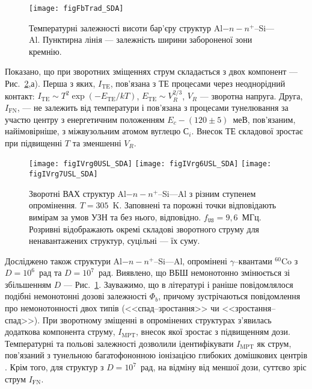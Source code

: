 \documentclass[a5paper,10pt,twoside,openany,article]{memoir} %
\begin{document}
\begin{figure}
\center
\texttt{[image: figFbTrad\_SDA]}
\caption{\label{figFbTrad_SDA}
Температурні залежності висоти бар'єру структур Al$-n-n^+$--Si---Al.
Пунктирна лінія --- залежність ширини забороненої зони кремнію.
}%
\end{figure}

Показано, що при зворотних зміщеннях струм складається з двох компонент --- Рис.~\ref{figIVrg0USL_SDA},а).
Перша з яких, $I_\mathrm{TE}$, пов'язана з ТЕ процесами через неоднорідний контакт: 
$I_\mathrm{TE}\sim T^2\exp(-E_\mathrm{TE}/kT)$,
$E_\mathrm{TE}\sim V_R^{2/3}$, 
$V_R$ --- зворотна напруга.
Друга, $I_\mathrm{FN}$, --- не залежить від температури і пов'язана з процесами тунелювання за участю
центру з енергетичним положенням $E_c-(120\pm5)$~меВ, пов'язаним, найімовірніше, з міжвузольним атомом вуглецю С$_i$.
Внесок ТЕ складової зростає при підвищенні $T$ та зменшенні $V_R$.

\begin{figure}
\center
\texttt{[image: figIVrg0USL\_SDA]}\hfill
\texttt{[image: figIVrg6USL\_SDA]}\hfill
\texttt{[image: figIVrg7USL\_SDA]}
\caption{\label{figIVrg0USL_SDA}
Зворотні  ВАХ  структур Al$-n-n^+$--Si---Al з різним ступенем опромінення.
$T=305$~K.
Заповнені та порожні точки відповідають вимірам за умов УЗН та без нього, відповідно.
$f_\mathtt{US}=9,6$~МГц.
Розривні відображають окремі складові зворотного струму для ненавантажених структур,
суцільні --- їх суму.
}%
\end{figure}

Досліджено також структури Al$-n-n^+$--Si---Al, опромінені $\gamma$--квантами $^{60}$Co з $D=10^6$~рад та $D=10^7$~рад.
Виявлено, що ВБШ немонотонно змінюється зі збільшенням $D$ --- Рис.~\ref{figFbTrad_SDA}.
Зауважимо, що в літературі і раніше повідомлялося подібні немонотонні дозові залежності $\Phi_{b}$, причому зустрічаються повідомлення про немонотонності двох типів (<<спад--зростання>> чи <<зростання--спад>>).
При зворотному зміщенні в опромінених структурах з'явилась додаткова компонента струму, $I_\mathrm{MPT}$, внесок якої зростає з підвищенням дози.
Температурні та польові залежності дозволили ідентифікувати $I_\mathrm{MPT}$ як струм, пов'язаний з тунельною багатофононною іонізацією глибоких домішкових центрів \cite{Ganichev:2000}.
Крім того, для структур з $D=10^7$~рад, на відміну від меншої дози, суттєво зріс струм $I_\mathrm{FN}$.
\end{document}
